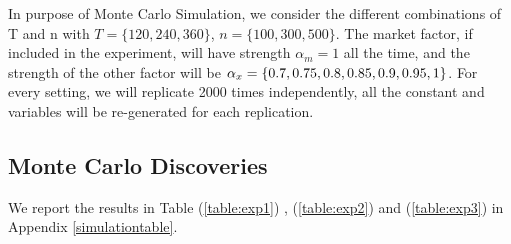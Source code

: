 
In purpose of Monte Carlo Simulation, we consider the different combinations of T and n with $T = \{120, 240, 360\}$, $n =\{100, 300, 500\} $.
The market factor, if included in the experiment, will have strength $\alpha_m = 1$ all the time, and the strength of the other factor will be $\alpha_{x} = \{0.7, 0.75, 0.8,0.85, \\
0.9,0.95, 1\}$. For every setting, we will replicate 2000 times independently, all the constant and variables will be re-generated for each replication.


 
\subsection{Monte Carlo Discoveries}
We report the results in Table (\ref{table:exp1}) , (\ref{table:exp2}) and (\ref{table:exp3}) in Appendix \ref{simulationtable}.

